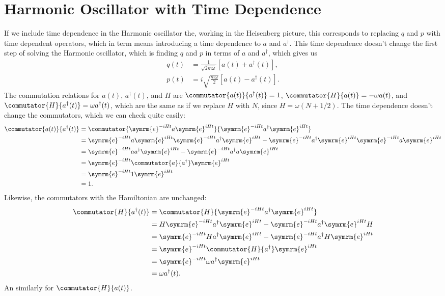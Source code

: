 \documentclass[fleqn]{NotesClass}
\newcommand{\e}{\symrm{e}}
\newcommand{\hermit}{{\dagger}}
\begin{document}
    \section{Harmonic Oscillator with Time Dependence}
    If we include time dependence in the Harmonic oscillator the, working in the Heisenberg picture, this corresponds to replacing \(q\) and \(p\) with time dependent operators, which in term means introducing a time dependence to \(a\) and \(a^\hermit\).
    This time dependence doesn't change the first step of solving the Harmonic oscillator, which is finding \(q\) and \(p\) in terms of \(a\) and \(a^\hermit\), which gives us
    \begin{align}
        q(t) &= \frac{1}{\sqrt{2m\omega}} [a(t) + a^\hermit(t)],\\
        p(t) &= i\sqrt{\frac{m\omega}{2}} [a(t) - a^\hermit(t)].
    \end{align}
    The commutation relations for \(a(t)\), \(a^\hermit(t)\), and \(H\) are \(\commutator{a(t)}{a^\hermit(t)} = 1\), \(\commutator{H}{a(t)} = -\omega a(t)\), and \(\commutator{H}{a^\hermit(t)} = \omega a^\hermit(t)\), which are the same as if we replace \(H\) with \(N\), since \(H = \omega(N + 1/2)\).
    The time dependence doesn't change the commutators, which we can check quite easily:
    \begin{align}
        \commutator{a(t)}{a^\hermit(t)} &= \commutator{\e^{-iHt}a\e^{iHt}}{\e^{-iHt}a^\hermit\e^{iHt}}\\
        &= \e^{-iHt}a\e^{iHt}\e^{-iHt}a^\hermit\e^{iHt} - \e^{-iHt}a^\hermit\e^{iHt}\e^{-iHt}a\e^{iHt}\\
        &= \e^{-iHt}aa^\hermit\e^{iHt} - \e^{-iHt}a^\hermit a\e^{iHt}\\
        &= \e^{-iHt} \commutator{a}{a^\hermit}\e^{iHt}\\
        &= \e^{-iHt} 1 \e^{iHt}\\
        &= 1.
    \end{align}
    Likewise, the commutators with the Hamiltonian are unchanged:
    \begin{align}
        \commutator{H}{a^\hermit(t)} &= \commutator{H}{\e^{-iHt}a^\hermit \e^{iHt}}\\
        &= H\e^{-iHt}a^\hermit\e^{iHt} - \e^{-iHt}a^\hermit\e^{iHt} H\\
        &= \e^{-iHt} Ha^\hermit \e^{iHt} - \e^{-iHt} a^\hermit H \e^{iHt}\\
        &= \e^{-iHt} \commutator{H}{a^\hermit} \e^{iHt}\\
        &= \e^{-iHt} \omega a^\hermit \e^{iHt}\\
        &= \omega a^\hermit(t).
    \end{align}
    An similarly for \(\commutator{H}{a(t)}\).
    
\end{document}

